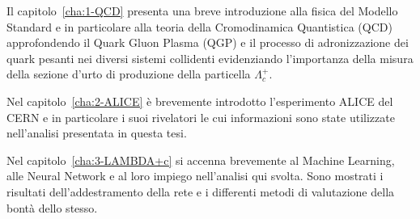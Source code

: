 \begin{comment}
Nel presente lavoro di tesi il barione $\Lambda^{+}_{c}$ è stato ricostruito attraverso il suo decadimento $\Lambda_{c}^{+} \to p K^{0}_{S}$ utilizzando i dati raccolti dall’esperimento ALICE in collisioni $pp$ ad una energia del centro di massa di $\sqrt{s} =$ \qty{13}{TeV}. L’analisi si è concentrata nell’intervallo di impulso trasverso $1 < p_{T} < 2$ \unit{\giga \eV \per \clight} poichè a basso $p_{T}$ i vari modelli teorici mostrano una certa discrepanza nelle loro previsioni ed è quindi possibile attraverso l’analisi dei dati sperimentali valutare l’attendibilità di tali previsioni così come fornire input per correzioni ai vari modelli. Data la difficoltà di questa misura, sono state utilizzate tecniche di Machine Learning per mezzo dell'allenamento di una Rete Neurale. In particolare sono state utilizzate le librerie open source TensorFlow e l’API Keras creando un pacchetto indipendente da quelli già esistenti, come TMVA di ROOT, personalizzabile e ampliabile a piacimento.
\end{comment}

Il capitolo~\ref{cha:1-QCD} presenta una breve introduzione alla fisica del Modello  Standard e in particolare alla teoria della Cromodinamica Quantistica (QCD) approfondendo il Quark Gluon Plasma (QGP) e il processo di adronizzazione dei quark pesanti nei diversi sistemi collidenti evidenziando l’importanza della misura della sezione d’urto di produzione della particella $\Lambda^{+}_{c}$.

Nel capitolo~\ref{cha:2-ALICE} è brevemente introdotto l’esperimento ALICE del CERN e in particolare i suoi rivelatori le cui informazioni sono state utilizzate nell’analisi presentata in questa tesi.

Nel capitolo~\ref{cha:3-LAMBDA+c} si accenna brevemente al Machine Learning, alle Neural Network e al loro impiego nell'analisi qui svolta. Sono mostrati i risultati dell'addestramento della rete e i differenti metodi di valutazione della bontà dello stesso.
